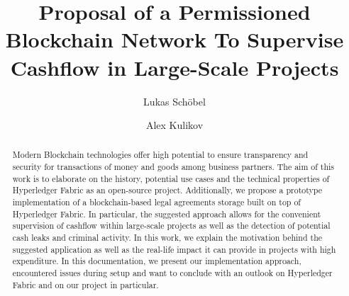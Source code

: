 \documentclass[sigconf]{acmart}
\begin{document}
\title{Proposal of a Permissioned Blockchain Network \linebreak To Supervise Cashflow in Large-Scale Projects}


\author{Lukas Sch{\"o}bel}

\author{Alex Kulikov}

\renewcommand{\shortauthors}{Sch{\"o}bel and Kulikov}

\begin{abstract}
Modern Blockchain technologies offer high potential to ensure transparency and security for transactions of money and goods among business partners. The aim of this work is to elaborate on the history, potential use cases and the technical properties of Hyperledger Fabric as an open-source project. Additionally, we propose a prototype implementation of a blockchain-based legal agreements storage built on top of Hyperledger Fabric. In particular, the suggested approach allows for the convenient supervision of cashflow within large-scale projects as well as the detection of potential cash leaks and criminal activity. In this work, we explain the motivation behind the suggested application as well as the real-life impact it can provide in projects with high expenditure. In this documentation, we present our implementation approach, encountered issues during setup and want to conclude with an outlook on Hyperledger Fabric and on our project in particular. 
\end{abstract}
\end{document}
